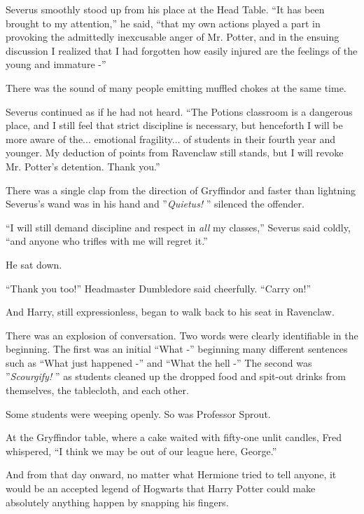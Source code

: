 Severus smoothly stood up from his place at the Head Table. ``It has
been brought to my attention,'' he said, ``that my own actions played a
part in provoking the admittedly inexcusable anger of Mr. Potter, and in
the ensuing discussion I realized that I had forgotten how easily
injured are the feelings of the young and immature -''

There was the sound of many people emitting muffled chokes at the same
time.

Severus continued as if he had not heard. ``The Potions classroom is a
dangerous place, and I still feel that strict discipline is necessary,
but henceforth I will be more aware of the... emotional
fragility... of students in their fourth year and younger. My
deduction of points from Ravenclaw still stands, but I will revoke Mr.
Potter's detention. Thank you.''

There was a single clap from the direction of Gryffindor and faster than
lightning Severus's wand was in his hand and ''\emph{Quietus!} '' silenced
the offender.

``I will still demand discipline and respect in \emph{all} my classes,''
Severus said coldly, ``and anyone who trifles with me will regret it.''

He sat down.

``Thank you too!'' Headmaster Dumbledore said cheerfully. ``Carry on!''

And Harry, still expressionless, began to walk back to his seat in
Ravenclaw.

There was an explosion of conversation. Two words were clearly
identifiable in the beginning. The first was an initial ``What -''
beginning many different sentences such as ``What just happened -'' and
``What the hell -'' The second was ''\emph{Scourgify!} '' as students
cleaned up the dropped food and spit-out drinks from themselves, the
tablecloth, and each other.

Some students were weeping openly. So was Professor Sprout.

At the Gryffindor table, where a cake waited with fifty-one unlit
candles, Fred whispered, ``I think we may be out of our league here,
George.''

And from that day onward, no matter what Hermione tried to tell anyone,
it would be an accepted legend of Hogwarts that Harry Potter could make
absolutely anything happen by snapping his fingers.
